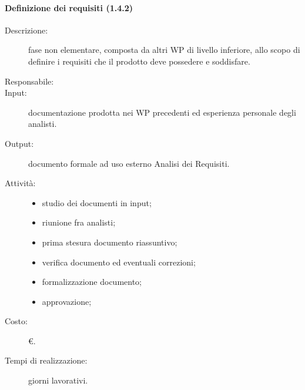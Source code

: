 \paragraph{Definizione dei requisiti (1.4.2)}
\begin{description}
\item[Descrizione:] fase non elementare, composta da altri WP di livello inferiore, allo scopo di definire i requisiti che il prodotto deve possedere e soddisfare.
\item[Responsabile:] 
\item[Input:] documentazione prodotta nei WP precedenti ed esperienza personale degli analisti.
\item[Output:] documento formale ad uso esterno Analisi dei Requisiti.
\item[Attività:]
\begin{itemize}
\item studio dei documenti in input;
\item riunione fra analisti;
\item prima stesura documento riassuntivo;
\item verifica documento ed eventuali correzioni;
\item formalizzazione documento;
\item approvazione;
\end{itemize}
\item[Costo:] \euro{}.
\item[Tempi di realizzazione:]  giorni lavorativi.
\end{description}

